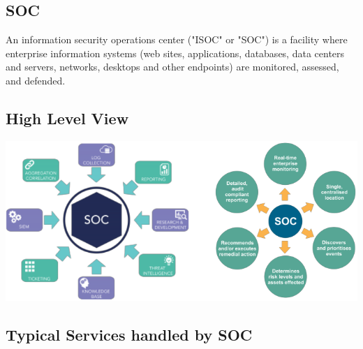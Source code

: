 \documentclass[a4]{article}
\begin{document}
\begin{multicols}{3}
\section{SOC}
An information security operations center ("ISOC" or "SOC") is a facility where enterprise information systems 
(web sites, applications, databases, data centers and servers, networks, desktops and other endpoints) 
are monitored, assessed, and defended. 

\subsection{High Level View}
\begin{center}
    \begin{minipage}{\columnwidth}
        \includegraphics[width=\columnwidth]{soc-high-level.png}
    \end{minipage}
\end{center}

\subsection{Typical Services handled by SOC}


\end{multicols}
\end{document}
